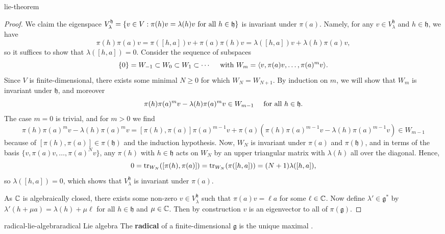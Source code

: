 \begin{example}{lie-theorem}
\begin{proof}
        We claim the eigenspace $V^\mathfrak{h}_\lambda = \{ v \in V : \pi(h) v = \lambda(h) v \textup{ for all } h \in \mathfrak{h} \}$ is invariant under $\pi(a)$. Namely, for any $v \in V^\mathfrak{h}_\lambda$ and $h \in \mathfrak{h}$, we have
        \[ \pi(h) \pi(a) v = \pi([h, a]) v + \pi(a) \pi(h) v = \lambda([h, a]) v + \lambda(h) \pi(a) v , \]
        so it suffices to show that $\lambda([h, a]) = 0$. Consider the sequence of subspaces
        \[ \{ 0 \} = W_{-1} \subset W_0 \subset W_1 \subset \cdots \quad \textup{ with }  W_m = \langle v, \pi(a) v, \ldots, \pi(a)^m v \rangle . \]
        Since $V$ is finite-dimensional, there exists some minimal $N \ge 0$ for which $W_N = W_{N + 1}$. By induction on $m$, we will show that $W_m$ is invariant under $\mathfrak{h}$, and moreover
        \[ \pi(h) \pi(a)^m v - \lambda(h) \pi(a)^m v \in W_{m - 1} \quad \textup{ for all } h \in \mathfrak{h} . \]
        The case $m = 0$ is trivial, and for $m > 0$ we find
        \[ \pi(h)\pi(a)^m v - \lambda(h) \pi(a)^m v = [\pi(h), \pi(a)] \pi(a)^{m - 1} v + \pi(a) \left( \pi(h) \pi(a)^{m - 1} v - \lambda(h) \pi(a)^{m - 1} v \right) \in W_{m - 1} \]
        because of $[\pi(h), \pi(a)] \in \pi(\mathfrak{h})$ and the induction hypothesis. Now, $W_N$ is invariant under $\pi(a)$ and $\pi(\mathfrak{h})$, and in terms of the basis $\{ v, \pi(a) v, \ldots, \pi(a)^N v \}$, any $\pi(h)$ with $h \in \mathfrak{h}$ acts on $W_N$ by an upper triangular matrix with $\lambda(h)$ all over the diagonal. Hence,
        \[ 0 = \operatorname{tr}_{W_N}([\pi(h), \pi(a)]) = \operatorname{tr}_{W_N}(\pi([h, a])) = (N + 1) \lambda([h, a]) , \]
        so $\lambda([h, a]) = 0$, which shows that $V^\mathfrak{h}_\lambda$ is invariant under $\pi(a)$.
        
        As $\mathbb{C}$ is algebraically closed, there exists some non-zero $v \in V^\mathfrak{h}_\lambda$ such that $\pi(a) v = \ell a$ for some $\ell \in \mathbb{C}$. Now define $\lambda' \in \mathfrak{g}^*$ by $\lambda'(h + \mu a) = \lambda(h) + \mu \ell$ for all $h \in \mathfrak{h}$ and $\mu \in \mathbb{C}$. Then by construction $v$ is an eigenvector to all of $\pi(\mathfrak{g})$.
    \end{proof}
\end{example}

\begin{topic}{radical-lie-algebra}{radical Lie algebra}
    The \textbf{radical} of a finite-dimensional  $\mathfrak{g}$ is the unique maximal  .
\end{topic}

